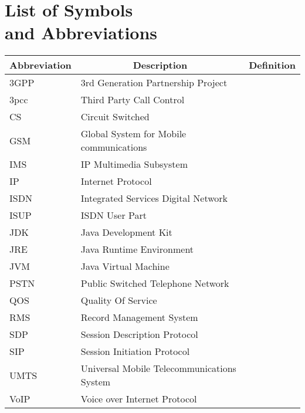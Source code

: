 

\chapter[List of Symbols and Abbreviations]{List of Symbols\\ and Abbreviations}

\begin{center}
\small
\begin{longtable}{lp{3.0in}c}
\toprule
\multicolumn{1}{c}{Abbreviation}
                & \multicolumn{1}{c}{Description}
                                & \multicolumn{1}{c}{Definition}\\ \midrule\addlinespace[2pt] \endhead
\bottomrule\endfoot
3GPP			& 3rd Generation Partnership Project 		& \pref{sym:3GPP}\\
3pcc			& Third Party Call Control						& \pref{sym:3pcc}\\
CS				& Circuit Switched								& \pref{sym:CS}\\
GSM			& Global System for Mobile communications & \pref{sym:GSM}\\
IMS			& IP Multimedia Subsystem						& \pref{sym:IMS}\\
IP				& Internet Protocol								& \pref{sym:IP}\\
ISDN			& Integrated Services Digital Network		& \pref{sym:ISDN}\\
ISUP			& ISDN User Part									& \pref{sym:ISUP}\\
JDK			& Java Development Kit        				& \pref{sym:JDK}\\
JRE			& Java Runtime Environment        			& \pref{sym:JRE}\\
JVM			& Java Virtual Machine        				& \pref{sym:JVM}\\
PSTN			& Public Switched Telephone Network			& \pref{sym:PSTN}\\
QOS			& Quality Of Service								& \pref{sym:QOS}\\
RMS			& Record Management System 					& \pref{sym:RMS}\\
SDP			& Session Description Protocol				& \pref{sym:SDP}\\
SIP			& Session Initiation Protocol					& \pref{sym:SIP}\\
UMTS			& Universal Mobile Telecommunications System & \pref{sym:UMTS}\\
VoIP			& Voice over Internet Protocol				& \pref{sym:VoIP}\\


\end{longtable}
\end{center}

